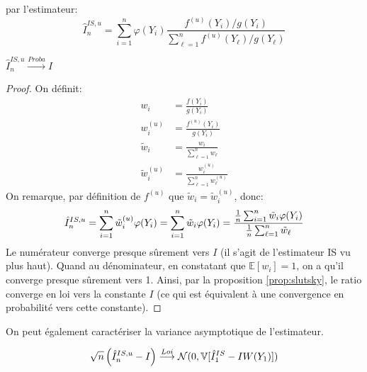 par l'estimateur:
$$\hat{I}^{IS,u}_n = \sum_{i = 1}^n \varphi(Y_i) \frac{f^{(u)}(Y_i)/g(Y_i)}{\sum_{\ell = 1}^n f^{(u)}(Y_\ell) / g(Y_\ell)}$$
\begin{propriete}
$\hat{I}^{IS,u}_n \overset{Proba}{\longrightarrow} I$
\end{propriete}
\begin{proof}
On définit:
\begin{align*}
w_i &= \frac{f(Y_i)}{g(Y_i)}\\
w_i^{(u)} &= \frac{f^{(u)}(Y_i)}{g(Y_i)}\\
\tilde{w}_i &= \frac{w_i}{\sum_{\ell = 1}^n w_\ell}\\
\tilde{w}^{(u)}_i &= \frac{w^{(u)}_i}{\sum_{\ell = 1}^n w^{(u)}_\ell}
\end{align*}
On remarque, par définition de $f^{(u)}$ que $\tilde{w}_i = \tilde{w}^{(u)}_i$, donc:
$$\hat{I}^{IS,u}_n = \sum_{i = 1}^n \tilde{w}^{(u)}_i \varphi(Y_i) = \sum_{i = 1}^n \tilde{w}_i \varphi(Y_i)\\
= \frac{\frac{1}{n} \sum_{i = 1}^n \tilde{w}_i \varphi(Y_i)}{\frac{1}{n}\sum_{\ell = 1}^n \tilde{w}_\ell}$$
Le numérateur converge presque sûrement vers $I$ (il s'agit de l'estimateur IS vu plus haut). 
Quand au dénominateur, en constatant que $\mathbb{E}[w_i] = 1$, on a qu'il converge presque sûrement vers 1. Ainsi, par la proposition \ref{prop:slutsky}, le ratio converge en loi vers la constante $I$ (ce qui est équivalent à une convergence en probabilité vers cette constante).
\end{proof}
On peut également caractériser la variance asymptotique de l'estimateur.
\begin{propriete}
$$\sqrt{n}\left(\hat{I}^{IS,u}_n - I \right) \overset{Loi}{\longrightarrow} \mathcal{N}(0, \mathbb{V}[\hat{I}_1^{IS} - IW(Y_1)])$$
\end{propriete}
